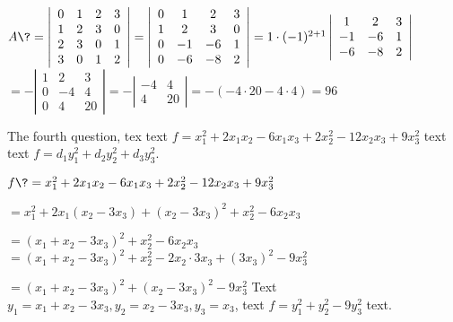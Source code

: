 \documentclass[12pt,most]{randexam}
\begin{document}
\smallskip

\begin{solution}
$A \? = \left|\begin{array}{cccc}
    0 & 1 & 2 & 3\\
    1 & 2 & 3 & 0\\
    2 & 3 & 0 & 1\\
    3 & 0 & 1 & 2
  \end{array}\right| = \left|\begin{array}{cccc}
    0 & 1 & 2 & 3\\
    1 & 2 & 3 & 0\\
    0 & - 1 & - 6 & 1\\
    0 & - 6 & - 8 & 2
  \end{array}\right| = 1 \cdot (- 1)^{2 + 1} \left|\begin{array}{ccc}
    1 & 2 & 3\\
    - 1 & - 6 & 1\\
    - 6 & - 8 & 2
  \end{array}\right|$ 
\+ $= -\left|\begin{array}{ccc}
    1 & 2 & 3\\
    0 & - 4 & 4\\
    0 & 4 & 20
  \end{array}\right| = - \left|\begin{array}{cc}
    - 4 & 4\\
    4 & 20
  \end{array}\right| = -(-4\cdot20-4\cdot4) = 96$ 
\end{solution}

\vfill

\begin{question}
The fourth question, tex text $f = x_1^2 + 2 x_1 x_2 - 6 x_1 x_3 + 2 x_2^2 - 12
x_2 x_3 + 9 x^2_3$ text text $f = d_1 y^2_1 + d_2 y^2_2 + d_3 y^2_3$.
\end{question}

\smallskip

\begin{solution}
$f \? = x_1^2 + 2 x_1 x_2 - 6 x_1 x_3 + 2 x_2^2 - 12 x_2 x_3 + 9 x^2_3$ \par
  \+ $= x_1^2 + 2 x_1 (x_2 - 3 x_3) + (x_2 - 3 x_3)^2 + x_2^2 - 6 x_2 x_3 $ \par
  \+ $= (x_1 + x_2 - 3 x_3)^2 + x_2^2 - 6 x_2 x_3$ 
  \+ $= (x_1 + x_2 - 3 x_3)^2 + x_2^2 - 2 x_2 \cdot 3 x_3 + (3 x_3)^2 - 9x_3^2$ \par
  \+ $= (x_1 + x_2 - 3 x_3)^2 + (x_2 - 3 x_3)^2 - 9 x_3^2$ 
Text $y_1 = x_1 + x_2 - 3 x_3, y_2 = x_2 - 3 x_3, y_3 = x_3$, \newline
text $f = y_1^2 + y_2^2 - 9y_3^2$ text.
\end{solution}
\end{document}
